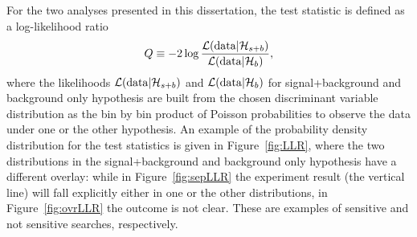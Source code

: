 For the two analyses presented in this dissertation, the test statistic
is defined as a log-likelihood ratio 
\begin{equation}\label{eq:llr}
Q \equiv -2\log \dfrac{\mathcal{L}({\rm data}|\mathcal{H}_{s+b})}{\mathcal{L}({\rm data}|\mathcal{H}_{b})},
\end{equation}
where the likelihoods $\mathcal{L}({\rm data}|\mathcal{H}_{s+b})$
 and $\mathcal{L}({\rm data}|\mathcal{H}_{b})$ for 
signal+background and background only hypothesis
are built from the chosen discriminant variable distribution 
as the bin by bin product of Poisson probabilities to observe the
data under one or the other hypothesis.
An example of the probability density distribution
for the test statistics is given in Figure~\ref{fig:LLR},
where the two distributions in the signal+background and background only hypothesis
have a different overlay: while in Figure~\ref{fig:sepLLR} the experiment
result (the vertical line) will fall explicitly either
in one or the other distributions, in Figure~\ref{fig:ovrLLR} the
outcome is not clear. These are examples of sensitive and not sensitive searches,
respectively.

